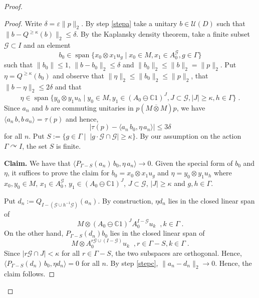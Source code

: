 \documentclass[a4paper,11pt]{amsart}
\numberwithin{equation}{section}
\begin{document}
\begin{proof}
\begin{proof}
Write $\delta = {\varepsilon} \|p\|_2$. By step \ref{stepa} take a unitary $b \in {\mathcal{U}}(D)$ such that $\|b - Q^{{{\scriptscriptstyle\geqslant}} \kappa}(b)\|_2 {\leqslant} \delta$. By the Kaplansky density theorem, take a finite subset ${\mathcal{G}} \subset I$ and an element
$$b_0 \in {\operatorname{span}} \{ x_0 {\otimes} x_1 u_g \mid x_0 \in M, x_1 \in A_0^{\mathcal{G}}, g \in \Gamma \}$$
such that $\|b_0\| {\leqslant} 1$, $\|b - b_0\|_2 {\leqslant} \delta$ and $\|b_0\|_2 {\leqslant} \|b\|_2 = \|p\|_2$. Put $\eta = Q^{{{\scriptscriptstyle\geqslant}} \kappa}(b_0)$ and observe that $\|\eta\|_2 {\leqslant} \|b_0\|_2 {\leqslant} \|p\|_2$, that $\|b - \eta \|_2 {\leqslant} 2 \delta$ and that
$$\eta \in {\operatorname{span}} \{ y_0 {\otimes} y_1 u_h \mid y_0 \in M, y_1 \in (A_0 \ominus {\mathbb{C}} 1)^J, J \subset {\mathcal{G}}, |J| {\geqslant} \kappa, h \in \Gamma \} \; .$$
Since $a_n$ and $b$ are commuting unitaries in $p(M {\mathbin{\overline{\otimes}}} M)p$, we have $\langle a_n \, b , b \, a_n \rangle = \tau(p)$ and hence,
\begin{equation}\label{eq.myeq}
\big| \tau(p) - \langle a_n \, b_0 , \eta \, a_n \rangle \big| {\leqslant} 3 \delta
\end{equation}
for all $n$. Put $S := \{g \in \Gamma \mid \; |g \cdot {\mathcal{G}} \cap {\mathcal{G}} | {\geqslant} \kappa \}$. By our assumption on the action $\Gamma {\curvearrowright} I$, the set $S$ is finite.

{\bf Claim.} We have that $\langle P_{\Gamma - S}(a_n) \, b_0 , \eta \, a_n \rangle {\rightarrow} 0$. Given the special form of $b_0$ and $\eta$, it suffices to prove the claim for $b_0 = x_0 {\otimes} x_1 u_g$ and $\eta = y_0 {\otimes} y_1 u_h$ where $x_0,y_0 \in M$, $x_1 \in A_0^{\mathcal{G}}$, $y_1 \in (A_0 \ominus {\mathbb{C}}1)^J$, $J \subset {\mathcal{G}}$, $|J| {\geqslant} \kappa$ and $g,h \in \Gamma$.

Put $d_n := Q_{I - ({\mathcal{G}} \cup h^{-1} {\mathcal{G}})}(a_n)$. By construction, $\eta d_n$ lies in the closed linear span of
$$M {\otimes} (A_0 \ominus {\mathbb{C}} 1)^J A_0^{I - {\mathcal{G}}} u_k \;\; , k \in \Gamma \; .$$
On the other hand, $P_{\Gamma - S}(d_n) b_0$ lies in the closed linear span of
$$M {\otimes} A_0^{r{\mathcal{G}} \cup (I- {\mathcal{G}})} u_k \;\; , r \in \Gamma - S, k \in \Gamma \; .$$
Since $|r {\mathcal{G}} \cap J|< \kappa$ for all $r \in \Gamma - S$, the two subspaces are orthogonal. Hence, $\langle P_{\Gamma - S}(d_n)\, b_0 , \eta d_n \rangle = 0$ for all $n$. By step \ref{stepc}, $\|a_n - d_n\|_2 {\rightarrow} 0$. Hence, the claim follows.


\end{proof}
\end{proof}
\end{document}
